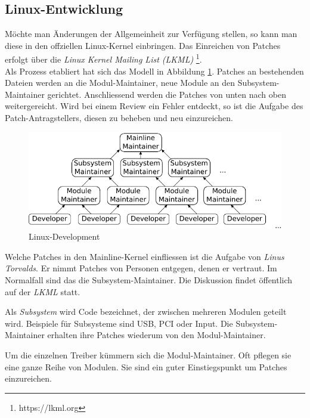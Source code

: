 \subsection{Linux-Entwicklung}

Möchte man Änderungen der Allgemeinheit zur Verfügung stellen, so kann man diese in 
den offziellen Linux-Kernel einbringen. Das Einreichen von Patches erfolgt über die \emph{Linux Kernel Mailing List (LKML)}
\footnote{https://lkml.org}. \\

Als Prozess etabliert hat sich das Modell in Abbildung \ref{fig:linuxdev}. Patches an bestehenden Dateien werden an die Modul-Maintainer, 
neue Module an den Subsystem-Maintainer gerichtet. Anschliessend werden die Patches von unten nach oben weitergereicht. Wird bei einem
Review ein Fehler entdeckt, so ist die Aufgabe des Patch-Antragstellers, diesen zu beheben und neu einzureichen. \\ \newline

\begin{figure}[h!]
   \begin{center}
      \includegraphics{images/linuxdev}
   \end{center}
   \caption[Linux-Development]{Linux-Development}
   \label{fig:linuxdev}
\end{figure}

\begin{description}[leftmargin=5cm]
   \item[Mainline-Maintainer]
      Welche Patches in den Mainline-Kernel einfliessen ist die Aufgabe von \emph{Linus Torvalds}.
      Er nimmt Patches von Personen entgegen, denen er vertraut. Im Normalfall sind das die Subsystem-Maintainer. Die Diskussion
      findet öffentlich auf der \emph{LKML} statt. 

   \item[Subsystem-Maintainer]
      Als \emph{Subsystem} wird Code bezeichnet, der zwischen mehreren Modulen geteilt wird. Beispiele
      für Subsysteme sind USB, PCI oder Input. Die Subsystem-Maintainer erhalten ihre Patches wiederum von den Modul-Maintainer.

   \item[Modul-Maintainer]
      Um die einzelnen Treiber kümmern sich die Modul-Maintainer. Oft pflegen sie eine ganze Reihe von Modulen. Sie sind
      ein guter Einstiegspunkt um Patches einzureichen.
\end{description}

